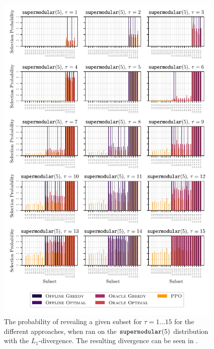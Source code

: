 \begin{figure}[t!]
  \centering
	\includegraphics[width=\textwidth]{figures/l1_norm_convex5_coalition_bars.pdf}
	\caption{ The probability of revealing a given subset for $\tau=1\ldots 15$ for the different approaches, when ran on the $\supermodular[5]$ distribution with the $ L_1 $-divergence. 
		The resulting divergence can be seen in .
	}
\end{figure}

